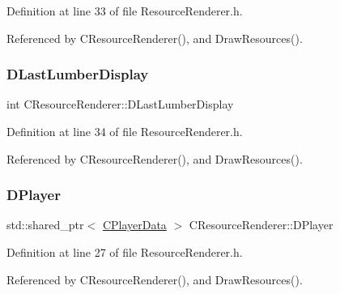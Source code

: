 Definition at line 33 of file Resource\+Renderer.\+h.



Referenced by C\+Resource\+Renderer(), and Draw\+Resources().

\hypertarget{classCResourceRenderer_a9e2658ecff79b486956e118114a2fb52}{}\label{classCResourceRenderer_a9e2658ecff79b486956e118114a2fb52} 
\subsubsection{\texorpdfstring{D\+Last\+Lumber\+Display}{DLastLumberDisplay}}
{\footnotesize\ttfamily int C\+Resource\+Renderer\+::\+D\+Last\+Lumber\+Display\hspace{0.3cm}{\ttfamily [protected]}}



Definition at line 34 of file Resource\+Renderer.\+h.



Referenced by C\+Resource\+Renderer(), and Draw\+Resources().

\hypertarget{classCResourceRenderer_ad8479113a1d9b1ab1a134ca86bc823e0}{}\label{classCResourceRenderer_ad8479113a1d9b1ab1a134ca86bc823e0} 
\subsubsection{\texorpdfstring{D\+Player}{DPlayer}}
{\footnotesize\ttfamily std\+::shared\+\_\+ptr$<$ \hyperlink{classCPlayerData}{C\+Player\+Data} $>$ C\+Resource\+Renderer\+::\+D\+Player\hspace{0.3cm}{\ttfamily [protected]}}



Definition at line 27 of file Resource\+Renderer.\+h.



Referenced by C\+Resource\+Renderer(), and Draw\+Resources().

\hypertarget{classCResourceRenderer_a7674293a7af59bfc3a75f57e729d9a6f}{}\label{classCResourceRenderer_a7674293a7af59bfc3a75f57e729d9a6f} 
